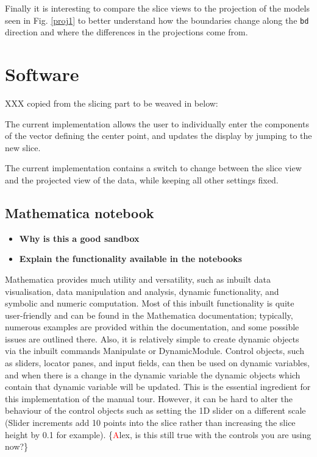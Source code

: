 \documentclass[]{interact}
\theoremstyle{plain}%
\theoremstyle{definition}
\theoremstyle{remark}
\providecommand{\tightlist}{%
  \setlength{\itemsep}{0pt}\setlength{\parskip}{0pt}}
\def\tightlist{}
\begin{document}
Finally it is interesting to compare the slice views to the projection
of the models seen in Fig. \ref{proj1} to better understand how the
boundaries change along the \texttt{bd} direction and where the
differences in the projections come from.

\hypertarget{sec:implementation}{%
\section{Software}\label{sec:implementation}}

XXX copied from the slicing part to be weaved in below:

The current implementation allows the user to individually enter the
components of the vector defining the center point, and updates the
display by jumping to the new slice.

The current implementation contains a switch to change between the slice
view and the projected view of the data, while keeping all other
settings fixed.

\hypertarget{mathematica-notebook}{%
\subsection{Mathematica notebook}\label{mathematica-notebook}}

\begin{itemize}
\tightlist
\item
  \textbf{Why is this a good sandbox}
\item
  \textbf{Explain the functionality available in the notebooks}
\end{itemize}

Mathematica provides much utility and versatility, such as inbuilt data
visualisation, data manipulation and analysis, dynamic functionality,
and symbolic and numeric computation. Most of this inbuilt functionality
is quite user-friendly and can be found in the Mathematica
documentation; typically, numerous examples are provided within the
documentation, and some possible issues are outlined there. Also, it is
relatively simple to create dynamic objects via the inbuilt commands
Manipulate or DynamicModule. Control objects, such as sliders, locator
panes, and input fields, can then be used on dynamic variables, and when
there is a change in the dynamic variable the dynamic objects which
contain that dynamic variable will be updated. This is the essential
ingredient for this implementation of the manual tour. However, it can
be hard to alter the behaviour of the control objects such as setting
the 1D slider on a different scale (Slider increments add 10 points into
the slice rather than increasing the slice height by 0.1 for example).
\{\textcolor{red}Alex, is this still true with the controls you are
using now?\}
\end{document}
